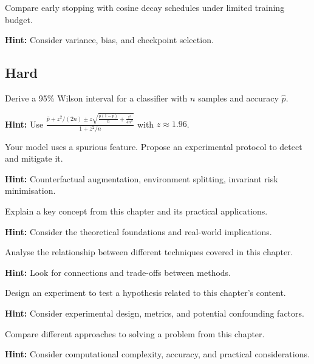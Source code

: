 \begin{problem}
Compare early stopping with cosine decay schedules under limited training budget.

\textbf{Hint:} Consider variance, bias, and checkpoint selection.
\end{problem}

\subsection*{Hard}

\begin{problem}
Derive a 95\% Wilson interval for a classifier with $n$ samples and accuracy $\hat{p}$.

\textbf{Hint:} Use $\frac{\hat{p}+z^2/(2n) \pm z\sqrt{\frac{\hat{p}(1-\hat{p})}{n}+\frac{z^2}{4n^2}}}{1+z^2/n}$ with $z\approx1.96$.
\end{problem}

\begin{problem}
Your model uses a spurious feature. Propose an experimental protocol to detect and mitigate it.

\textbf{Hint:} Counterfactual augmentation, environment splitting, invariant risk minimisation.
\end{problem}



\begin{problem}
Explain a key concept from this chapter and its practical applications.

\textbf{Hint:} Consider the theoretical foundations and real-world implications.
\end{problem}

\begin{problem}
Analyse the relationship between different techniques covered in this chapter.

\textbf{Hint:} Look for connections and trade-offs between methods.
\end{problem}

\begin{problem}
Design an experiment to test a hypothesis related to this chapter's content.

\textbf{Hint:} Consider experimental design, metrics, and potential confounding factors.
\end{problem}

\begin{problem}
Compare different approaches to solving a problem from this chapter.

\textbf{Hint:} Consider computational complexity, accuracy, and practical considerations.
\end{problem}

